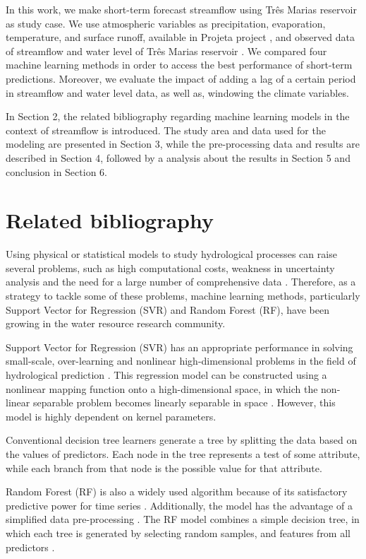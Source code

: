 \documentclass[12pt]{article}
\begin{document}
In this work, we make short-term forecast streamflow using Três Marias reservoir as study case. We use atmospheric variables as precipitation, evaporation, temperature, and surface runoff, available in Projeta project \cite{inpe}, and observed data of streamflow and water level of Três Marias reservoir \cite{onsnivel,onsvazao}. We compared four machine learning methods in order to access the best performance of short-term predictions. Moreover, we evaluate the impact of adding a lag of a certain period in streamflow and water level data, as well as, windowing the climate variables.

In Section 2, the related bibliography regarding machine learning models in the context of streamflow is introduced. The study area and data used for the modeling are presented in Section 3, while the pre-processing data and results are described in Section 4, followed by a analysis about the results in Section 5 and conclusion in Section 6.

\section{Related bibliography}

Using physical or statistical models to study hydrological processes can raise several problems, such as high computational costs, weakness in uncertainty analysis and the need for a large number of comprehensive data \cite{ardabili2019deep}. Therefore, as a strategy to tackle some of these problems, machine learning methods, particularly Support Vector for Regression (SVR) and Random Forest (RF), have been growing in the water resource research community.

Support Vector for Regression (SVR) has an appropriate performance in solving small-scale, over-learning and nonlinear high-dimensional problems in the field of hydrological prediction \cite{xu,wang}. This regression model can be constructed using a nonlinear mapping function onto a high-dimensional space, in which the non-linear separable problem becomes linearly separable in space \cite{maity}. However, this model is highly dependent on kernel parameters.

Conventional decision tree learners generate a tree by splitting the data based on the values of predictors. Each node in the tree represents a test of some attribute, while each branch from that node is the possible value for that attribute.

Random Forest (RF) is also a widely used algorithm because of its satisfactory predictive power for time series \cite{wang}. Additionally, the model has the advantage of a simplified data pre-processing \cite{li}. The RF model combines a simple decision tree, in which each tree is generated by selecting random samples, and features from all predictors \cite{naghibi}.
\end{document}
